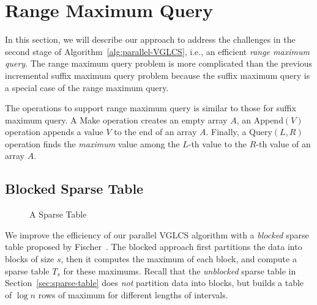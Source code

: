 \section{Range Maximum Query} \label{sec:parallelRMQ}

In this section, we will describe our approach to address the
challenges in the second stage of Algorithm~\ref{alg:parallel-VGLCS},
i.e., an efficient {\em range maximum query}.  The range maximum query
problem is more complicated than the previous incremental suffix
maximum query problem because the suffix maximum query is a special
case of the range maximum query.

The operations to support range maximum query is similar to those for
suffix maximum query.  A {\sc Make} operation creates an empty array
$A$, an {\sc Append}$(V)$ operation appends a value $V$ to the end of an
array $A$.  Finally, a {\sc Query}$(L, R)$ operation finds the {\em
maximum} value among the $L$-th value to the $R$-th value of an array
$A$.


\subsection{Blocked Sparse Table} \label{sec:blocked-sparse-table}

\begin{figure}[!thb]
  \centering {} 
  \caption{A Sparse Table}
  \label{fig:block-interval-decomposition}
\end{figure}

We improve the efficiency of our parallel VGLCS algorithm with a {\em
  blocked} sparse table proposed by
Fischer~\cite{Fischer2006TheoreticalAP}.  The blocked approach first
partitions the data into blocks of size $s$, then it computes the
maximum of each block, and compute a sparse table $T_s$ for these
maximums.  Recall that the {\em unblocked} sparse table in
Section~\ref{sec:sparse-table} does {\em not} partition data into
blocks, but builds a table of $\log n$ rows of maximum for different
lengths of intervals.

